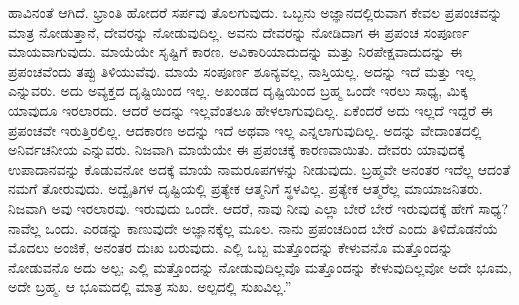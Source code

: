 ಹಾವಿನಂತೆ ಆಗಿದೆ. ಭ್ರಾಂತಿ ಹೋದರೆ ಸರ್ಪವು ತೊಲಗುವುದು. ಒಬ್ಬನು ಅಜ್ಞಾನದಲ್ಲಿರುವಾಗ ಕೇವಲ ಪ್ರಪಂಚವನ್ನು ಮಾತ್ರ ನೋಡುತ್ತಾನೆ, ದೇವರನ್ನು ನೋಡುವುದಿಲ್ಲ. ಅವನು ದೇವರನ್ನು ನೋಡಿದಾಗ ಈ ಪ್ರಪಂಚ ಸಂಪೂರ್ಣ ಮಾಯವಾಗುವುದು. ಮಾಯೆಯೇ ಸೃಷ್ಟಿಗೆ ಕಾರಣ. ಅವಿಕಾರಿಯಾದುದನ್ನು ಮತ್ತು ನಿರಪೇಕ್ಷವಾದುದನ್ನು ಈ ಪ್ರಪಂಚವೆಂದು ತಪ್ಪು ತಿಳಿಯುವೆವು. ಮಾಯೆ ಸಂಪೂರ್ಣ ಶೂನ್ಯವಲ್ಲ, ನಾಸ್ತಿಯಲ್ಲ. ಅದನ್ನು ಇದೆ ಮತ್ತು ಇಲ್ಲ ಎನ್ನುವರು. ಅದು ಅವ್ಯಕ್ತದ ದೃಷ್ಟಿಯಿಂದ ಇಲ್ಲ. ಅಖಂಡದ ದೃಷ್ಟಿಯಿಂದ ಬ್ರಹ್ಮ ಒಂದೇ ಇರಲು ಸಾಧ್ಯ, ಮಿಕ್ಕ ಯಾವುದೂ ಇರಲಾರದು. ಆದರೆ ಅದನ್ನು ಇಲ್ಲವೆಂತಲೂ ಹೇಳಲಾಗುವುದಿಲ್ಲ. ಏಕೆಂದರೆ ಅದು ಇಲ್ಲದೆ ಇದ್ದರೆ ಈ ಪ್ರಪಂಚವೇ ಇರುತ್ತಿರಲಿಲ್ಲ. ಆದಕಾರಣ ಅದನ್ನು ಇದೆ ಅಥವಾ ಇಲ್ಲ ಎನ್ನಲಾಗುವುದಿಲ್ಲ. ಅದನ್ನು ವೇದಾಂತದಲ್ಲಿ ಅನಿರ್ವಚನೀಯ ಎನ್ನುವರು. ನಿಜವಾಗಿ ಮಾಯೆಯೇ ಈ ಪ್ರಪಂಚಕ್ಕೆ ಕಾರಣವಾಯಿತು. ದೇವರು ಯಾವುದಕ್ಕೆ ಉಪಾದಾನವನ್ನು ಕೊಡುವನೋ ಅದಕ್ಕೆ ಮಾಯೆ ನಾಮರೂಪಗಳನ್ನು ನೀಡುವುದು. ಬ್ರಹ್ಮವೇ ಅನಂತರ ಇದೆಲ್ಲ ಆದಂತೆ ನಮಗೆ ತೋರುವುದು. ಅದ್ವೈತಿಗಳ ದೃಷ್ಟಿಯಲ್ಲಿ ಪ್ರತ್ಯೇಕ ಆತ್ಮನಿಗೆ ಸ್ಥಳವಿಲ್ಲ. ಪ್ರತ್ಯೇಕ ಆತ್ಮರೆಲ್ಲ ಮಾಯಾಜನಿತರು. ನಿಜವಾಗಿ ಅವು ಇರಲಾರವು. ಇರುವುದು ಒಂದೇ. ಆದರೆ, ನಾವು ನೀವು ಎಲ್ಲಾ ಬೇರೆ ಬೇರೆ ಇರುವುದಕ್ಕೆ ಹೇಗೆ ಸಾಧ್ಯ? ನಾವೆಲ್ಲ ಒಂದು. ಎರಡನ್ನು ಕಾಣುವುದೇ ಅಜ್ಞಾನಕ್ಕೆಲ್ಲ ಮೂಲ. ನಾನು ಪ್ರಪಂಚದಿಂದ ಬೇರೆ ಎಂದು ತಿಳಿದೊಡನೆಯೆ ಮೊದಲು ಅಂಜಿಕೆ, ಅನಂತರ ದುಃಖ ಬರುವುದು. ಎಲ್ಲಿ ಒಬ್ಬ ಮತ್ತೊಂದನ್ನು ಕೇಳುವನೊ ಮತ್ತೊಂದನ್ನು ನೋಡುವನೊ ಅದು ಅಲ್ಪ; ಎಲ್ಲಿ ಮತ್ತೊಂದನ್ನು ನೋಡುವುದಿಲ್ಲವೊ ಮತ್ತೊಂದನ್ನು ಕೇಳುವುದಿಲ್ಲವೋ ಅದೇ ಭೂಮ, ಅದೇ ಬ್ರಹ್ಮ. ಆ ಭೂಮದಲ್ಲಿ ಮಾತ್ರ ಸುಖ. ಅಲ್ಪದಲ್ಲಿ ಸುಖವಿಲ್ಲ.”

